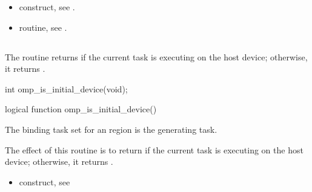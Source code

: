 \crossreferences
\begin{itemize}
\item {} construct, see 
.

\item {} routine, see 
. 
\end{itemize}









\subsection{}
\label{subsec:omp_is_initial_device}
\summary
The  routine returns  if the current task is executing 
on the host device; otherwise, it returns .

\begin{samepage}
\format
\ccppspecificstart
\begin{boxedcode}
int omp\_is\_initial\_device(void);
\end{boxedcode}
\ccppspecificend
\end{samepage}

\fortranspecificstart
\begin{boxedcode}
logical function omp\_is\_initial\_device()
\end{boxedcode}
\fortranspecificend

\binding
The binding task set for an  region is the generating task.

\effect
The effect of this routine is to return  if the current task is executing on the host 
device; otherwise, it returns .

\crossreferences
\begin{itemize}
\item {} construct, see 
\end{itemize}









\subsection{}
\label{subsec:omp_get_max_task_priority}
\summary

